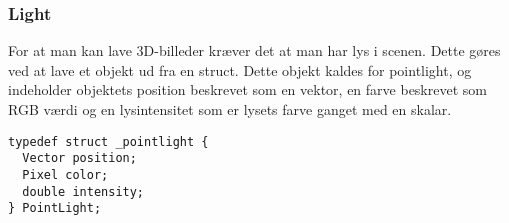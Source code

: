 \subsubsection{Light}
For at man kan lave 3D-billeder kræver det at man har lys i scenen. Dette gøres ved at lave et objekt ud fra en struct. Dette objekt kaldes for pointlight, og indeholder objektets position beskrevet som en vektor, en farve beskrevet som RGB værdi og en lysintensitet som er lysets farve ganget med en skalar.

\begin{lstlisting}[style=Cstyle, caption=light struct]
typedef struct _pointlight {
  Vector position;
  Pixel color;
  double intensity;
} PointLight;
\end{lstlisting}